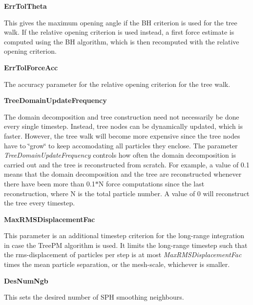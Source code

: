 \begin{DoxyItemize}
\item {\bfseries ErrTolTheta} \par
 This gives the maximum opening angle if the BH criterion is used for the tree walk. If the relative opening criterion is used instead, a first force estimate is computed using the BH algorithm, which is then recomputed with the relative opening criterion.
\end{DoxyItemize}


\begin{DoxyItemize}
\item {\bfseries ErrTolForceAcc} \par
 The accuracy parameter for the relative opening criterion for the tree walk.
\end{DoxyItemize}


\begin{DoxyItemize}
\item {\bfseries TreeDomainUpdateFrequency} \par
 The domain decomposition and tree construction need not necessarily be done every single timestep. Instead, tree nodes can be dynamically updated, which is faster. However, the tree walk will become more expensive since the tree nodes have to \char`\"{}grow\char`\"{} to keep accomodating all particles they enclose. The parameter {\itshape TreeDomainUpdateFrequency\/} controls how often the domain decomposition is carried out and the tree is reconstructed from scratch. For example, a value of 0.1 means that the domain decomposition and the tree are reconstructed whenever there have been more than 0.1$\ast$N force computations since the last reconstruction, where N is the total particle number. A value of 0 will reconstruct the tree every timestep.
\end{DoxyItemize}


\begin{DoxyItemize}
\item {\bfseries MaxRMSDisplacementFac} \par
 This parameter is an additional timestep criterion for the long-\/range integration in case the TreePM algorithm is used. It limits the long-\/range timestep such that the rms-\/displacement of particles per step is at most {\itshape MaxRMSDisplacementFac\/} times the mean particle separation, or the mesh-\/scale, whichever is smaller.
\end{DoxyItemize}


\begin{DoxyItemize}
\item {\bfseries DesNumNgb} \par
 This sets the desired number of SPH smoothing neighbours.
\end{DoxyItemize}


